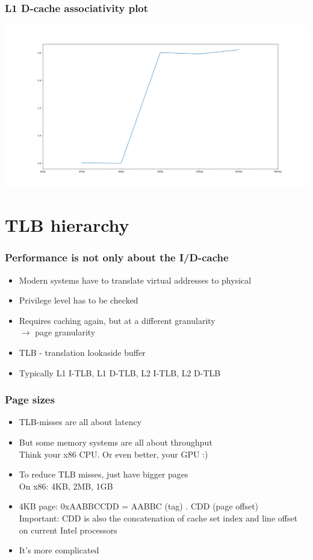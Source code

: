 \documentclass{beamer}
\begin{document}
\begin{frame}
\frametitle{L1 D-cache associativity plot}
\includegraphics[scale=.25]{img/l1_d_assoc.png}
\end{frame}

\section{TLB hierarchy}

\begin{frame}
\frametitle{Performance is not only about the I/D-cache}
\begin{itemize}
\item Modern systems have to translate virtual addresses to physical
\item Privilege level has to be checked
\item Requires caching again, but at a different granularity\\
$\rightarrow$ page granularity
\item TLB - translation lookaside buffer
\item Typically L1 I-TLB, L1 D-TLB, L2 I-TLB, L2 D-TLB
\end{itemize}
\end{frame}

\begin{frame}
\frametitle{Page sizes}
\begin{itemize}
\item TLB-misses are all about latency
\item But some memory systems are all about throughput\\
Think your x86 CPU. Or even better, your GPU :)
\item To reduce TLB misses, just have bigger pages\\
On x86: 4KB, 2MB, 1GB
\item 4KB page: 0xAABBCCDD = AABBC (tag) . CDD (page offset)\\
Important: CDD is also the concatenation of cache set index and line offset on current Intel processors\\
\item It's more complicated
\end{itemize}
\end{frame}
\end{document}
